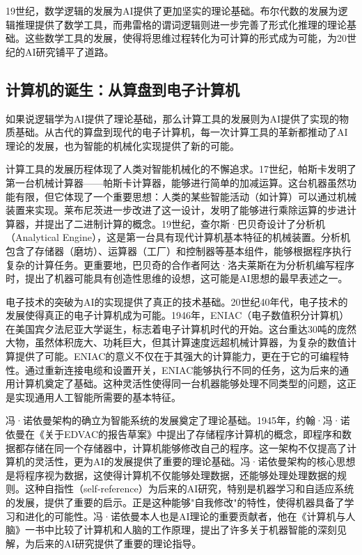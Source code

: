 19世纪，数学逻辑的发展为AI提供了更加坚实的理论基础。布尔代数的发展为逻辑推理提供了数学工具，而弗雷格的谓词逻辑则进一步完善了形式化推理的理论基础。这些数学工具的发展，使得将思维过程转化为可计算的形式成为可能，为20世纪的AI研究铺平了道路。

\subsection{计算机的诞生：从算盘到电子计算机}

如果说逻辑学为AI提供了理论基础，那么计算工具的发展则为AI提供了实现的物质基础。从古代的算盘到现代的电子计算机，每一次计算工具的革新都推动了AI理论的发展，也为智能的机械化实现提供了新的可能。

计算工具的发展历程体现了人类对智能机械化的不懈追求。17世纪，帕斯卡发明了第一台机械计算器——帕斯卡计算器，能够进行简单的加减运算。这台机器虽然功能有限，但它体现了一个重要思想：人类的某些智能活动（如计算）可以通过机械装置来实现。莱布尼茨进一步改进了这一设计，发明了能够进行乘除运算的步进计算器，并提出了二进制计算的概念。19世纪，查尔斯·巴贝奇设计了分析机（Analytical Engine），这是第一台具有现代计算机基本特征的机械装置。分析机包含了存储器（磨坊）、运算器（工厂）和控制器等基本组件，能够根据程序执行复杂的计算任务。更重要地，巴贝奇的合作者阿达·洛夫莱斯在为分析机编写程序时，提出了机器可能具有创造性思维的设想，这可能是AI思想的最早表述之一。

电子技术的突破为AI的实现提供了真正的技术基础。20世纪40年代，电子技术的发展使得真正的电子计算机成为可能。1946年，ENIAC（电子数值积分计算机）在美国宾夕法尼亚大学诞生，标志着电子计算机时代的开始。这台重达30吨的庞然大物，虽然体积庞大、功耗巨大，但其计算速度远超机械计算器，为复杂的数值计算提供了可能。ENIAC的意义不仅在于其强大的计算能力，更在于它的可编程特性。通过重新连接电缆和设置开关，ENIAC能够执行不同的任务，这为后来的通用计算机奠定了基础。这种灵活性使得同一台机器能够处理不同类型的问题，这正是实现通用人工智能所需要的基本特征。

冯·诺依曼架构的确立为智能系统的发展奠定了理论基础。1945年，约翰·冯·诺依曼在《关于EDVAC的报告草案》中提出了存储程序计算机的概念，即程序和数据都存储在同一个存储器中，计算机能够修改自己的程序。这一架构不仅提高了计算机的灵活性，更为AI的发展提供了重要的理论基础。冯·诺依曼架构的核心思想是将程序视为数据，这使得计算机不仅能够处理数据，还能够处理处理数据的规则。这种自指性（self-reference）为后来的AI研究，特别是机器学习和自适应系统的发展，提供了重要的启示。正是这种能够"自我修改"的特性，使得机器具备了学习和进化的可能性。冯·诺依曼本人也是AI理论的重要贡献者，他在《计算机与人脑》一书中比较了计算机和人脑的工作原理，提出了许多关于机器智能的深刻见解，为后来的AI研究提供了重要的理论指导。


